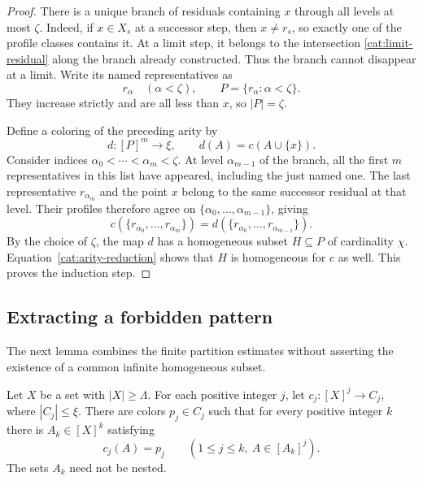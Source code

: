 \begin{proof}
There is a unique branch of residuals containing $x$ through all
levels at most $\zeta$. Indeed, if $x\in X_s$ at a successor step,
then $x\ne r_s$, so exactly one of the profile classes contains it.
At a limit step, it belongs to the intersection
\eqref{cat:limit-residual} along the branch already constructed.
Thus the branch cannot disappear at a limit. Write its named
representatives as
\[
 r_\alpha\quad(\alpha<\zeta),
 \qquad P=\{r_\alpha:\alpha<\zeta\}.
\]
They increase strictly and are all less than $x$, so $|P|=\zeta$.

Define a coloring of the preceding arity by
\[
 d:[P]^m\longrightarrow\xi,
 \qquad d(A)=c(A\cup\{x\}).
\]
Consider indices $\alpha_0<\cdots<\alpha_m<\zeta$. At level
$\alpha_{m-1}$ of the branch, all the first $m$ representatives in
this list have appeared, including the just named one.
The last representative $r_{\alpha_m}$ and the point $x$ belong to
the same successor residual at that level. Their profiles therefore
agree on $\{\alpha_0,\ldots,\alpha_{m-1}\}$, giving
\begin{equation}\label{cat:arity-reduction}
 c(\{r_{\alpha_0},\ldots,r_{\alpha_m}\})
   =d(\{r_{\alpha_0},\ldots,r_{\alpha_{m-1}}\}).
\end{equation}
By the choice of $\zeta$, the map $d$ has a homogeneous subset
$H\subseteq P$ of cardinality $\chi$. Equation~\eqref{cat:arity-reduction}
shows that $H$ is homogeneous for $c$ as well. This proves the
induction step.
\end{proof}

\subsection{Extracting a forbidden pattern}

The next lemma combines the finite partition estimates without
asserting the existence of a common infinite homogeneous subset.

\begin{lemma}\label{cat:finite-patterns}
Let $X$ be a set with $|X|\ge\Lambda$. For each positive integer
$j$, let $c_j:[X]^j\to C_j$, where $|C_j|\le\xi$. There are colors
$p_j\in C_j$ such that for every positive integer $k$ there is
$A_k\in[X]^k$ satisfying
\[
 c_j(A)=p_j\qquad
 (1\le j\le k,\ A\in[A_k]^j).
\]
The sets $A_k$ need not be nested.
\end{lemma}

